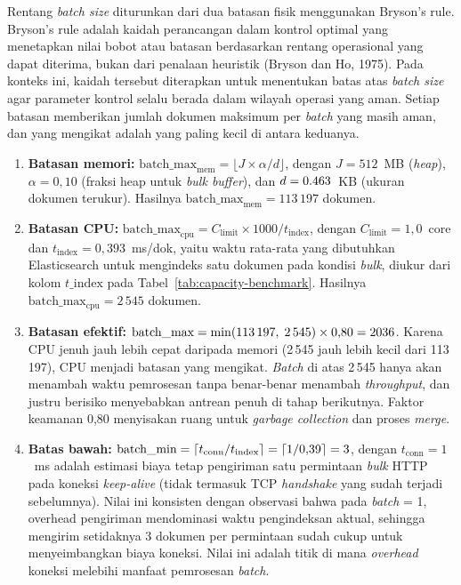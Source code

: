 Rentang \emph{batch size} diturunkan dari dua batasan fisik menggunakan Bryson's rule.
Bryson's rule adalah kaidah perancangan dalam kontrol optimal yang menetapkan nilai bobot
atau batasan berdasarkan rentang operasional yang dapat diterima, bukan dari penalaan
heuristik (Bryson dan Ho, 1975).
Pada konteks ini, kaidah tersebut diterapkan untuk menentukan batas atas \emph{batch size}
agar parameter kontrol selalu berada dalam wilayah operasi yang aman.
Setiap batasan memberikan jumlah dokumen maksimum per \emph{batch} yang masih aman, dan yang
mengikat adalah yang paling kecil di antara keduanya.

\begin{enumerate}
\item \textbf{Batasan memori:}
$\text{batch\_max}_{\text{mem}} = \lfloor J \times \alpha / d \rfloor$,
dengan $J = 512$~MB (\emph{heap}), $\alpha = 0{,}10$ (fraksi heap untuk \emph{bulk buffer}),
dan $d = \text{0.463}$~KB (ukuran dokumen terukur).
Hasilnya $\text{batch\_max}_{\text{mem}} = 113\,197$ dokumen.

\item \textbf{Batasan CPU:}
$\text{batch\_max}_{\text{cpu}} = C_{\text{limit}} \times 1000 / t_{\text{index}}$,
dengan $C_{\text{limit}} = 1{,}0$~core dan $t_{\text{index}} = 0{,}393$~ms/dok, yaitu waktu
rata-rata yang dibutuhkan Elasticsearch untuk mengindeks satu dokumen pada kondisi \emph{bulk},
diukur dari kolom $t\_\text{index}$ pada Tabel~\ref{tab:capacity-benchmark}.
Hasilnya $\text{batch\_max}_{\text{cpu}} = 2\,545$ dokumen.

\item \textbf{Batasan efektif:}
$\text{batch\_max} = \min(113\,197,\; 2\,545) \times 0{,}80 = 2036$.
Karena CPU jenuh jauh lebih cepat daripada memori (2\,545 jauh lebih kecil dari 113\,197),
CPU menjadi batasan yang mengikat.
\emph{Batch} di atas 2\,545 hanya akan menambah waktu pemrosesan tanpa benar-benar menambah
\emph{throughput}, dan justru berisiko menyebabkan antrean penuh di tahap berikutnya.
Faktor keamanan 0,80 menyisakan ruang untuk \emph{garbage collection} dan proses \emph{merge}.

\item \textbf{Batas bawah:}
$\text{batch\_min} = \lceil t_{\text{conn}} / t_{\text{index}} \rceil = \lceil 1/0{,}39 \rceil = 3$,
dengan $t_{\text{conn}} = 1$~ms adalah estimasi biaya tetap pengiriman satu permintaan
\emph{bulk} HTTP pada koneksi \emph{keep-alive} (tidak termasuk TCP \emph{handshake}
yang sudah terjadi sebelumnya).
Nilai ini konsisten dengan observasi bahwa pada \emph{batch} = 1, overhead pengiriman
mendominasi waktu pengindeksan aktual, sehingga mengirim setidaknya 3 dokumen per
permintaan sudah cukup untuk menyeimbangkan biaya koneksi.
Nilai ini adalah titik di mana \emph{overhead} koneksi melebihi manfaat pemrosesan \emph{batch}.
\end{enumerate}

